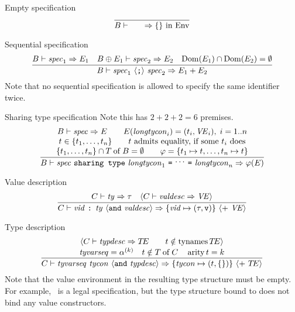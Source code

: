 \begin{inference-rule}{Empty specification}
\begin{equation}\label{rule:static-modules:emptyspec}
\vcenter{\infer{\B\ts\emptyspec\ra\emptymap{\rm\ in}\ \Env}
    {}}
\end{equation}
\end{inference-rule}

\begin{inference-rule}{Sequential specification}
\begin{equation}\label{rule:static-modules:seqspec}
\vcenter{\infer{\B\ts\seqspec\ra\plusmap{\E_{1}}{\E_{2}}}
  {\B\ts\spec_{1}\ra\E_{1}
    & \B\oplus\E_{1}\ts\spec_{2}\ra\E_{2}
    & \Dom(\E_{1})\cap\Dom(\E_{2}) = \emptyset}}
\end{equation}
Note that no sequential specification is allowed to specify the same
identifier twice.
\end{inference-rule}

\begin{inference-rule}{Sharing type specification}
Note this has $2+2+2=6$ premises.
\begin{equation}\label{rule:static-modules:sharspec}
\vcenter{\infer{\B\ts \newsharingspec\ra \rea(\E)}
  {\deduce{\{\t_{1},\ldots,\t_{n}\}\cap\of{\T}{\B} = \emptyset\qquad
           \rea = \{\t_{1}\mapsto\t,\ldots,\t_{n}\mapsto \t\}}
    {\deduce{t\in\{\t_{1},\ldots,\t_{n}\}\qquad\hbox{$\t$ admits equality, if some $\t_{i}$ does}}
      {\B\ts \spec \ra \E\qquad \E(\longtycon_{i}) = (\t_{i},\VE_{i}), \;i = 1..n}}}}
\end{equation}
\end{inference-rule}

\begin{inference-rule}{Value description}
\begin{equation}\label{rule:static-modules:valdesc}
\vcenter{\infer{\C\ts\valviddescription\ra\{\vid\mapsto(\tau,\isv)\}
       \ \optional{ +\ \VE}}
  {\C\ts\ty\ra\tau
    & \optional{\C\ts\valdesc\ra\VE}}}
\end{equation}
\end{inference-rule}

\begin{inference-rule}{Type description}
\begin{equation}\label{rule:static-modules:typedesc}
\vcenter{\infer{\C\ts\typdescription\ra\{\tycon\mapsto(\t,\emptymap)\}
       \ \optional{ +\ \TE}}
  {\deduce{\tyvarseq = \alphak\quad\t\notin\of{\T}{\C}\quad\arity\t=k}
    {\optional{\C\ts\typdesc\ra\TE\qquad\t\notin\TyNamesFcn\TE}}}}
\end{equation}
Note that the value environment in the resulting type structure must be
empty. For example, \mbox{} \mbox{}\  
is a legal specification, but the type structure bound to 
does not bind any value constructors.
\end{inference-rule}

